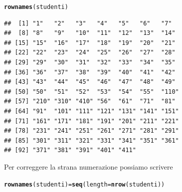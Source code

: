 \documentclass[onecolumn,12pt]{book}\usepackage[]{graphicx}\usepackage[]{color}
\makeatletter
\newcommand{\hlstd}[1]{\textcolor[rgb]{0.345,0.345,0.345}{#1}}%
\newcommand{\hlkwb}[1]{\textcolor[rgb]{0.69,0.353,0.396}{#1}}%
\newcommand{\hlkwc}[1]{\textcolor[rgb]{0.333,0.667,0.333}{#1}}%
\newcommand{\hlkwd}[1]{\textcolor[rgb]{0.737,0.353,0.396}{\textbf{#1}}}%
\newenvironment{kframe}{%
 \def\at@end@of@kframe{}%
 \ifinner\ifhmode%
  \def\at@end@of@kframe{\end{minipage}}%
  \begin{minipage}{\columnwidth}%
 \fi\fi%
 \def\FrameCommand##1{\hskip\@totalleftmargin \hskip-\fboxsep
 \colorbox{shadecolor}{##1}\hskip-\fboxsep
     \hskip-\linewidth \hskip-\@totalleftmargin \hskip\columnwidth}%
 \MakeFramed {\advance\hsize-\width
   \@totalleftmargin\z@ \linewidth\hsize
   \@setminipage}}%
 {\par\unskip\endMakeFramed%
 \at@end@of@kframe}
\newenvironment{knitrout}{}{} %
\makeatother
\begin{document}
\begin{knitrout}
\color{fgcolor}\begin{kframe}
\begin{alltt}
\hlkwd{rownames}\hlstd{(studenti)}
\end{alltt}
\begin{verbatim}
##  [1] "1"   "2"   "3"   "4"   "5"   "6"   "7"  
##  [8] "8"   "9"   "10"  "11"  "12"  "13"  "14" 
## [15] "15"  "16"  "17"  "18"  "19"  "20"  "21" 
## [22] "22"  "23"  "24"  "25"  "26"  "27"  "28" 
## [29] "29"  "30"  "31"  "32"  "33"  "34"  "35" 
## [36] "36"  "37"  "38"  "39"  "40"  "41"  "42" 
## [43] "43"  "44"  "45"  "46"  "47"  "48"  "49" 
## [50] "50"  "51"  "52"  "53"  "54"  "55"  "110"
## [57] "210" "310" "410" "56"  "61"  "71"  "81" 
## [64] "91"  "101" "111" "121" "131" "141" "151"
## [71] "161" "171" "181" "191" "201" "211" "221"
## [78] "231" "241" "251" "261" "271" "281" "291"
## [85] "301" "311" "321" "331" "341" "351" "361"
## [92] "371" "381" "391" "401" "411"
\end{verbatim}
\end{kframe}
\end{knitrout}
Per correggere la strana numerazione possiamo scrivere
\begin{knitrout}
\color{fgcolor}\begin{kframe}
\begin{alltt}
\hlkwd{rownames}\hlstd{(studenti)}\hlkwb{=}\hlkwd{seq}\hlstd{(}\hlkwc{length}\hlstd{=}\hlkwd{nrow}\hlstd{(studenti))}
\end{alltt}
\end{kframe}
\end{knitrout}
\end{document}
